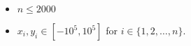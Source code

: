 \begin{itemize}
\tightlist
\item $n\le 2000$
\item $x_i,y_i\in [-10^5, 10^5]$ for $i\in \{1,2,\ldots,n\}$.
\end{itemize}
